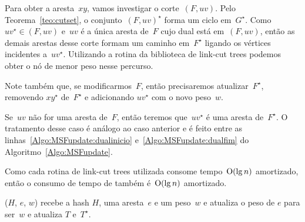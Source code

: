Para obter a aresta~$xy$, vamos investigar o corte~$(F, uv)$.
Pelo Teorema~\ref{teo:cutset}, o conjunto~$(F, uv)^\star$ forma um ciclo em~$G^\star$.
Como~$uv^\star\in(F, uv)$ e~$uv$ é a única aresta de~$F$ cujo dual está em~$(F, uv)$, então as demais arestas desse corte formam um caminho em~$F^\star$ ligando os vértices incidentes a~$uv^\star$.
Utilizando a rotina \linkcutMin{}  da biblioteca de link-cut trees podemos obter o nó de menor peso nesse percurso.

Note também que, se modificarmos~$F$, então precisaremos atualizar~$F^\star$, removendo $xy^\star$ de~$F^\star$ e adicionando $uv^\star$ com o novo peso~$w$.

Se~$uv$ não for uma aresta de~$F$, então teremos que~$uv^\star$ é uma aresta de~$F^\star$.
O tratamento desse caso é análogo ao caso anterior e é feito entre as linhas~\ref{Algo:MSFupdate:dualinicio} e~\ref{Algo:MSFupdate:dualfim} do Algoritmo~\ref{Algo:MSFupdate}.

Como cada rotina de link-cut trees utilizada consome tempo~$\mathrm{O}(\lg n)$ amortizado, então o consumo de tempo de \MSFupdate{} também é~$\mathrm{O}(\lg n)$ amortizado.



\newpage
\MSFupdate($H$, $e$, $w$) recebe a hash $H$, uma aresta~$e$ e um peso~$w$ e atualiza o peso de $e$ para ser~$w$ e atualiza $T$ e~$T^\star$.

